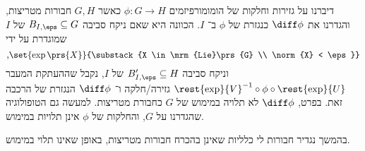 \documentclass[10pt, twoside]{book}
\newcommand{\Lie}{\mrm{Lie}}
\begin{document}

\begin{remark}

דיברנו על גזירות וחלקות של הומומורפיזמים
$\phi \colon G \to H$
כאשר
$G,H$
חבורות מטריצות, והגדרנו את
$\diff \phi$
כנגזרת של
$\phi$
ב־%
$I$.
הכוונה היא שאם ניקח סביבה
$B_{I,\eps} \subseteq G$
של
$I$
שמוגדרת על ידי
\[\text{,}\set{\exp\prs{X}}{\substack{X \in \Lie\prs{G} \\ \norm{X} < \eps}}\]
וניקח סביבה
$B_{I,\eps}' \subseteq H$
של
$I$,
נקבל שההעתקת המעבר
$\rest{\exp}{V}^{-1} \circ \phi \circ \rest{\exp}{U}$
גזירה/חלקה ו־%
$\diff \phi$
הנגזרת של הרכבה זאת.
בפרט,
$\diff \phi$
לא תלויה במימוש של
$G$
כחבורת מטריצות.
למעשה גם הטופולוגיה שהגדרנו על
$G$,
והחלקות של
$\phi$
אינן תלויות במימוש.

בהמשך נגדיר חבורות לי כלליות שאינן בהכרח חבורות מטריצות, באופן שאינו תלוי במימוש.
\end{remark}
\end{document}
